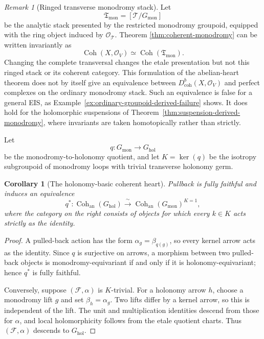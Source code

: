 \documentclass[12pt]{amsart}
\newtheorem{cor}[thm]{Corollary}
\theoremstyle{definition}
\theoremstyle{remark}
\newtheorem{rem}[thm]{Remark}
\numberwithin{equation}{section}
\newcommand{\CO}{\mathcal O}
\begin{document}
\begin{rem}[Ringed transverse monodromy stack]
\label{rem:ringed-monodromy-stack}
Let
\[
\mathfrak T_{\mathrm{mon}}
=
[\mathcal T/G_{\mathrm{mon}}]
\]
be the analytic stack presented by the restricted monodromy groupoid,
equipped with the ring object induced by \(\CO_{\mathcal T}\).  Theorem
\ref{thm:coherent-monodromy} can be written invariantly as
\[
\operatorname{Coh}(X,\CO_V)
\simeq
\operatorname{Coh}(\mathfrak T_{\mathrm{mon}}).
\]
Changing the complete transversal changes the etale presentation but not
this ringed stack or its coherent category.  This formulation of the
abelian-heart theorem does not by itself give an equivalence between
\(D^b_{\mathrm{coh}}(X,\CO_V)\) and perfect complexes on the ordinary
monodromy stack.  Such an equivalence is false for a general EIS, as
Example~\ref{ex:ordinary-groupoid-derived-failure} shows.  It does hold for
the holomorphic suspensions of
Theorem~\ref{thm:suspension-derived-monodromy}, where invariants are taken
homotopically rather than strictly.
\end{rem}

Let
\[
q:G_{\mathrm{mon}}\longrightarrow G_{\mathrm{hol}}
\]
be the monodromy-to-holonomy quotient, and let \(K=\ker(q)\) be the isotropy
subgroupoid of monodromy loops with trivial transverse holonomy germ.

\begin{cor}[The holonomy-basic coherent heart]
\label{cor:coherent-holonomy-basic}
Pullback is fully faithful and induces an equivalence
\[
q^*:
\operatorname{Coh}_{\mathrm{an}}(G_{\mathrm{hol}})
\xrightarrow{\ \sim\ }
\operatorname{Coh}_{\mathrm{an}}(G_{\mathrm{mon}})^{K=1},
\]
where the category on the right consists of objects for which every
\(k\in K\) acts strictly as the identity.
\end{cor}

\begin{proof}
A pulled-back action has the form
\(\alpha_g=\beta_{q(g)}\), so every kernel arrow acts as the identity.
Since \(q\) is surjective on arrows, a morphism between two pulled-back
objects is monodromy-equivariant if and only if it is
holonomy-equivariant; hence \(q^*\) is fully faithful.

Conversely, suppose \((\mathcal F,\alpha)\) is \(K\)-trivial.  For a
holonomy arrow \(h\), choose a monodromy lift \(g\) and set
\(\beta_h=\alpha_g\).  Two lifts differ by a kernel arrow, so this is
independent of the lift.  The unit and multiplication identities descend
from those for \(\alpha\), and local holomorphicity follows from the etale
quotient charts.  Thus \((\mathcal F,\alpha)\) descends to
\(G_{\mathrm{hol}}\).
\end{proof}
\end{document}

